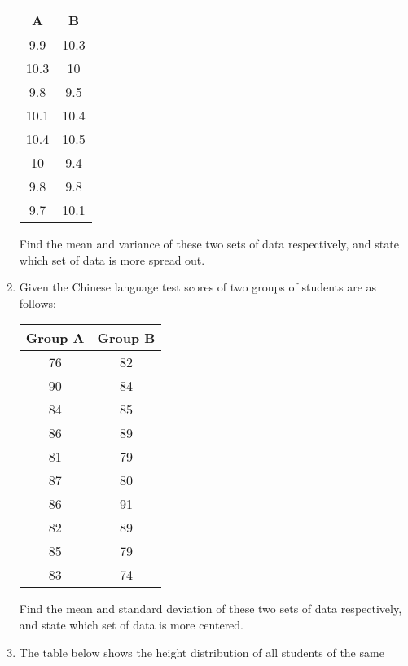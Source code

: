 \documentclass{report}
\begin{document}
\begin{multicols}{2}
\begin{enumerate}
          \begin{center}
            \begin{tabular}{|c|c|}
              \hline
              A    & B    \\
              \hline
              9.9  & 10.3 \\
              10.3 & 10   \\
              9.8  & 9.5  \\
              10.1 & 10.4 \\
              10.4 & 10.5 \\
              10   & 9.4  \\
              9.8  & 9.8  \\
              9.7  & 10.1 \\
              \hline
            \end{tabular}
          \end{center}
          Find the mean and variance of these two sets of data respectively, and state which set of data is more spread out.
    \item Given the Chinese language test scores of two groups of students are as
          follows:
          \begin{center}
            \begin{tabular}{|c|c|}
              \hline
              Group A & Group B \\
              \hline
              76      & 82      \\
              90      & 84      \\
              84      & 85      \\
              86      & 89      \\
              81      & 79      \\
              87      & 80      \\
              86      & 91      \\
              82      & 89      \\
              85      & 79      \\
              83      & 74      \\
              \hline
            \end{tabular}
          \end{center}
          Find the mean and standard deviation of these two sets of data respectively, and state which set of data is more centered.
    \item The table below shows the height distribution of all students of the same

\end{enumerate}
\end{multicols}
\end{document}
